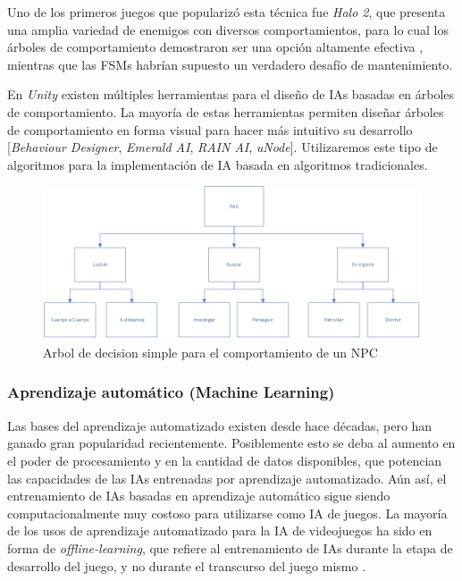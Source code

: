 \documentclass[a4paper]{article}
\begin{document}
Uno de los primeros juegos que popularizó esta técnica fue \textit{Halo 2}, que presenta una amplia  variedad de enemigos con diversos comportamientos, para lo cual los árboles de comportamiento demostraron ser una opción altamente efectiva \cite{implementation_of_behavior_tree_in_halo_2}, mientras que las FSMs habrían supuesto un verdadero desafío de mantenimiento.

En \textit{Unity} existen múltiples herramientas para el diseño de IAs basadas en árboles de comportamiento. La mayoría de estas herramientas permiten diseñar árboles de comportamiento en forma visual para hacer más intuitivo su desarrollo [\textit{Behaviour Designer}, \textit{Emerald AI}, \textit{RAIN AI}, \textit{uNode}]. Utilizaremos este tipo de algoritmos para la implementación de IA basada en algoritmos tradicionales.

\begin{figure}[ht]
    \centering
    \includegraphics[width=1\textwidth]{./images/behaviour-tree.png}
    \caption{Arbol de decision simple para el comportamiento de un NPC}
    \label{fig:bt}
\end{figure}

\subsubsection{Aprendizaje automático (Machine Learning)}

Las bases del aprendizaje automatizado existen desde hace décadas, pero han ganado gran popularidad recientemente. Posiblemente esto se deba al aumento en el poder de procesamiento y en la cantidad de datos disponibles, que potencian las capacidades de las IAs entrenadas por aprendizaje automatizado. Aún así, el entrenamiento de IAs basadas en aprendizaje automático sigue siendo computacionalmente muy costoso para utilizarse como IA de juegos. La mayoría de los usos de aprendizaje automatizado para la IA de videojuegos ha sido en forma de \textit{offline-learning}, que refiere al entrenamiento de IAs durante la etapa de desarrollo del juego, y no durante el transcurso del juego mismo \cite{machine_learning_in_digital_games:_a_survey}.
\end{document}
